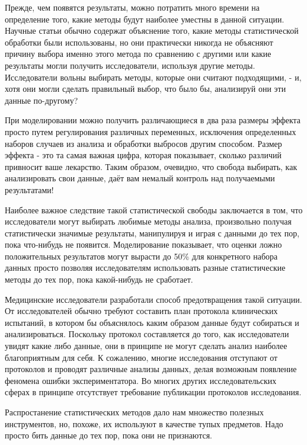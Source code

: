 Прежде, чем появятся результаты, можно потратить много времени на определение того, какие методы будут наиболее уместны в данной ситуации. Научные статьи обычно содержат объяснение того, какие методы статистической обработки были использованы, но они практически никогда не объясняют причину выбора именно этого метода по сравнению с другими или какие результаты могли получить исследователи, используя другие методы. Исследователи вольны выбирать методы, которые они считают подходящими, - и, хотя они могли сделать правильный выбор, что было бы, анализируй они эти данные по-другому?    

При моделировании можно получить различающиеся в два раза размеры эффекта просто путем регулирования различных переменных, исключения определенных наборов случаев из анализа и обработки выбросов другим способом. \cite{ioannidis_why_2008} Размер эффекта - это та самая важная цифра, которая показывает, сколько различий привносит ваше лекарство. Таким образом, очевидно, что свобода выбирать, как анализировать свои данные, даёт вам немалый контроль над получаемыми результатами!  

Наиболее важное следствие такой статистической свободы заключается в том, что исследователи могут выбирать любимые методы анализа, произвольно получая статистически значимые результаты, манипулируя и играя с данными до тех пор, пока что-нибудь не появится. Моделирование показывает, что оценки ложно положительных результатов могут вырасти до 50\% для конкретного набора данных просто позволяя исследователям использовать разные статистические методы до тех пор, пока какой-нибудь не сработает. \cite{simmons_false-positive_2011}

Медицинские исследователи разработали способ предотвращения такой ситуации. От исследователей обычно требуют составить план протокола клинических испытаний, в котором бы объяснялось каким образом данные будут собираться и анализироваться. Поскольку протокол составляется до того, как исследователи увидят какие либо данные, они в принципе не могут сделать анализ наиболее благоприятным для себя. К сожалению, многие исследования отступают от протоколов и проводят различные анализы данных, делая возможным появление феномена ошибки экспериментатора. \cite{chan_discrepancies_2008,chan_empirical_2004} Во многих других исследовательских сферах в принципе отсутствует требование публикации протоколов исследования.

Распростанение статистических методов дало нам множество полезных инструментов, но, похоже, их используют в качестве тупых предметов. Надо просто бить данные до тех пор, пока они не признаются.
